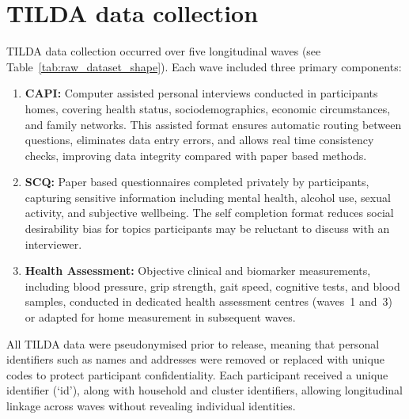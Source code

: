\section{TILDA data collection}
\gls{TILDA} data collection occurred over five longitudinal waves (see Table~\ref{tab:raw_dataset_shape}). Each wave included three primary components:
\begin{enumerate}
    \item \textbf{\gls{CAPI}:} Computer assisted personal interviews conducted in participants homes, covering health status, sociodemographics, economic circumstances, and family networks. This assisted format ensures automatic routing between questions, eliminates data entry errors, and allows real time consistency checks, improving data integrity compared with paper based methods.
    \item \textbf{\gls{SCQ}:} Paper based questionnaires completed privately by participants, capturing sensitive information including mental health, alcohol use, sexual activity, and subjective wellbeing. The self completion format reduces social desirability bias for topics participants may be reluctant to discuss with an interviewer.
    \item \textbf{Health Assessment:} Objective clinical and biomarker measurements, including blood pressure, grip strength, gait speed, cognitive tests, and blood samples, conducted in dedicated health assessment centres (waves~1 and~3) or adapted for home measurement in subsequent waves.
\end{enumerate}

All \gls{TILDA} data were pseudonymised prior to release, meaning that personal identifiers such as names and addresses were removed or replaced with unique codes to protect participant confidentiality. Each participant received a unique identifier (`id'), along with household and cluster identifiers, allowing longitudinal linkage across waves without revealing individual identities. 

\begin{table}[htbp]
\centering
\caption{Dimensions of raw \gls{TILDA} and harmonised datasets (version 5.5).}\label{tab:raw_dataset_shape}
\small
{}
\end{table}

